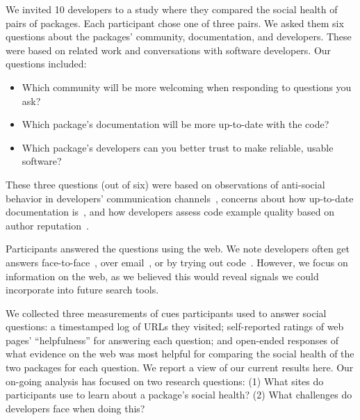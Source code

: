 We invited 10 developers to a study where they compared the social health of pairs of packages.
Each participant chose one of three pairs.
We asked them six questions about the packages' community, documentation, and developers.
These were based on related work and conversations with software developers.
Our questions included:
\begin{itemize}
\setlength{\itemsep}{0pt}
\setlength{\parskip}{0pt}
\setlength{\parsep}{0pt}  
\item Which community will be more welcoming when responding to questions you ask?
\item Which package's documentation will be more up-to-date with the code?
\item Which package's developers can you better trust to make reliable, usable software?
\end{itemize}
These three questions (out of six) were based on observations of anti-social behavior in developers' communication channels~\cite{storey_revolution_2014}, concerns about how up-to-date documentation is~\cite{storey_revolution_2014,nykaza_what_2002,lethbridge_how_2003,robillard_field_2011}, and how developers assess code example quality based on author reputation~\cite{robillard_field_2011}.

Participants answered the questions using the web.
We note developers often get answers face-to-face~\cite{latoza_maintaining_2006,storey_revolution_2014}, over email~\cite{latoza_maintaining_2006,ko_information_2007}, or by trying out code~\cite{brandt_two_2009}.
However, we focus on information on the web, as we believed this would reveal signals we could incorporate into future search tools.

We collected three measurements of cues participants used to answer social questions:
a timestamped log of URLs they visited;
self-reported ratings of web pages' ``helpfulness'' for answering each question;
and open-ended responses of what evidence on the web was most helpful for comparing the social health of the two packages for each question.
We report a view of our current results here.
Our on-going analysis has focused on two research questions:
(1) What sites do participants use to learn about a package's social health?
(2) What challenges do developers face when doing this?

